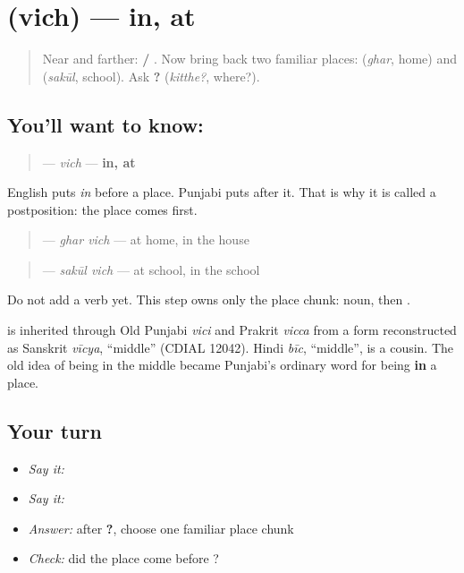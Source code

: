 \section[\texorpdfstring{\pa{ਵਿੱਚ} (vich)}{ਵਿੱਚ (vich)}]{ (vich) — in, at}

\label{lesson:PA-C176-vich}



\begin{quote}
Near and farther: \textbf{ / }. Now bring back two familiar places: \textbf{} (\emph{ghar}, home) and \textbf{} (\emph{sakūl}, school). Ask \textbf{?} (\emph{kitthe?}, where?).
\end{quote}

\subsection*{You'll want to know: }
\begin{quote}
\textbf{} — \emph{vich} — \textbf{in, at}
\end{quote}

English puts \emph{in} before a place. Punjabi puts \textbf{} after it. That is why it is called a postposition: the place comes first.

\begin{quote}
\textbf{ } — \emph{ghar vich} — at home, in the house
\end{quote}

\begin{quote}
\textbf{ } — \emph{sakūl vich} — at school, in the school
\end{quote}

Do not add a verb yet. This step owns only the place chunk: noun, then \textbf{}.

\begin{cousinweb}
\textbf{} is inherited through Old Punjabi \emph{vici} and Prakrit \emph{vicca} from a form reconstructed as Sanskrit \emph{vīcya}, “middle” (CDIAL 12042). Hindi \emph{bīc}, “middle”, is a cousin. The old idea of being in the middle became Punjabi's ordinary word for being \textbf{in} a place.
\end{cousinweb}

\subsection*{Your turn}
\begin{itemize}
\raggedright
  \item \emph{Say it:} \textbf{ }
  \item \emph{Say it:} \textbf{ }
  \item \emph{Answer:} after \textbf{?}, choose one familiar place chunk
  \item \emph{Check:} did the place come before \textbf{}?
\end{itemize}

